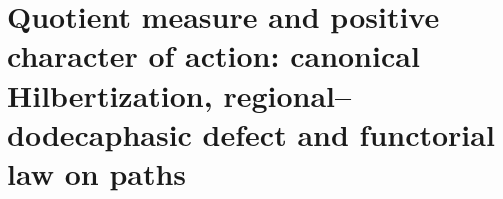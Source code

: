 \chapter{Quotient measure and positive character of action: canonical Hilbertization, regional--dodecaphasic defect and functorial law on paths}
\label{chap:p3-final:35:medida_accion_positiva}

